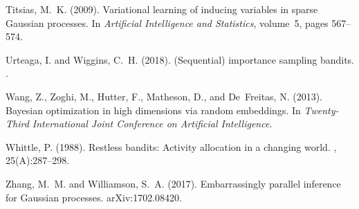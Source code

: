 \documentclass[12pt,letterpaper]{article}
\begin{document}
\begin{thebibliography}{}
Titsias, M.~K. (2009).
\newblock Variational learning of inducing variables in sparse {G}aussian
  processes.
\newblock In {\em Artificial Intelligence and Statistics}, volume~5, pages
  567--574.

Urteaga, I. and Wiggins, C.~H. (2018).
\newblock ({S}equential) importance sampling bandits.
.

Wang, Z., Zoghi, M., Hutter, F., Matheson, D., and De~Freitas, N. (2013).
\newblock Bayesian optimization in high dimensions via random embeddings.
\newblock In {\em Twenty-Third International Joint Conference on Artificial
  Intelligence}.

Whittle, P. (1988).
\newblock Restless bandits: Activity allocation in a changing world.
, 25(A):287--298.

Zhang, M.~M. and Williamson, S.~A. (2017).
\newblock Embarrassingly parallel inference for {G}aussian processes.
\newblock arXiv:1702.08420.

\end{thebibliography}
 
\end{document}

